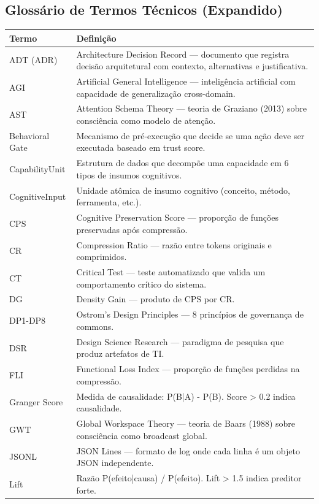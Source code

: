 \begin{apendicesenv}
\chapter{Glossário de Termos Técnicos (Expandido)}

\begin{longtable}{p{3.5cm}p{9.5cm}}
\toprule
\textbf{Termo} & \textbf{Definição} \\
\midrule
ADT (ADR) & Architecture Decision Record — documento que registra decisão arquitetural com contexto, alternativas e justificativa. \\
AGI & Artificial General Intelligence — inteligência artificial com capacidade de generalização cross-domain. \\
AST & Attention Schema Theory — teoria de Graziano (2013) sobre consciência como modelo de atenção. \\
Behavioral Gate & Mecanismo de pré-execução que decide se uma ação deve ser executada baseado em trust score. \\
CapabilityUnit & Estrutura de dados que decompõe uma capacidade em 6 tipos de insumos cognitivos. \\
CognitiveInput & Unidade atômica de insumo cognitivo (conceito, método, ferramenta, etc.). \\
CPS & Cognitive Preservation Score — proporção de funções preservadas após compressão. \\
CR & Compression Ratio — razão entre tokens originais e comprimidos. \\
CT & Critical Test — teste automatizado que valida um comportamento crítico do sistema. \\
DG & Density Gain — produto de CPS por CR. \\
DP1-DP8 & Ostrom's Design Principles — 8 princípios de governança de commons. \\
DSR & Design Science Research — paradigma de pesquisa que produz artefatos de TI. \\
FLI & Functional Loss Index — proporção de funções perdidas na compressão. \\
Granger Score & Medida de causalidade: P(B|A) - P(B). Score > 0.2 indica causalidade. \\
GWT & Global Workspace Theory — teoria de Baars (1988) sobre consciência como broadcast global. \\
JSONL & JSON Lines — formato de log onde cada linha é um objeto JSON independente. \\
Lift & Razão P(efeito|causa) / P(efeito). Lift > 1.5 indica preditor forte. \\

\end{longtable}
\end{apendicesenv}
